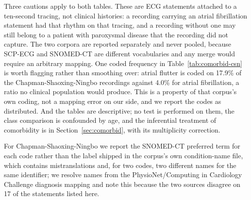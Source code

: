 \documentclass[11pt]{article}
\begin{document}
Three cautions apply to both tables. These are ECG statements attached to a ten-second tracing, not clinical histories: a recording carrying an atrial fibrillation statement had that rhythm on that tracing, and a recording without one may still belong to a patient with paroxysmal disease that the recording did not capture. The two corpora are reported separately and never pooled, because SCP-ECG and SNOMED-CT are different vocabularies and any merge would require an arbitrary mapping. One coded frequency in Table~\ref{tab:comorbid-csn} is worth flagging rather than smoothing over: atrial flutter is coded on 17.9\% of the Chapman-Shaoxing-Ningbo recordings against 4.0\% for atrial fibrillation, a ratio no clinical population would produce. This is a property of that corpus's own coding, not a mapping error on our side, and we report the codes as distributed. And the tables are descriptive; no test is performed on them, the class comparison is confounded by age, and the inferential treatment of comorbidity is in Section~\ref{sec:comorbid}, with its multiplicity correction.

For Chapman-Shaoxing-Ningbo we report the SNOMED-CT preferred term for each code rather than the label shipped in the corpus's own condition-name file, which contains mistranslations and, for two codes, two different names for the same identifier; we resolve names from the PhysioNet/Computing in Cardiology Challenge diagnosis mapping \cite{georgia} and note this because the two sources disagree on 17 of the statements listed here.
\end{document}
